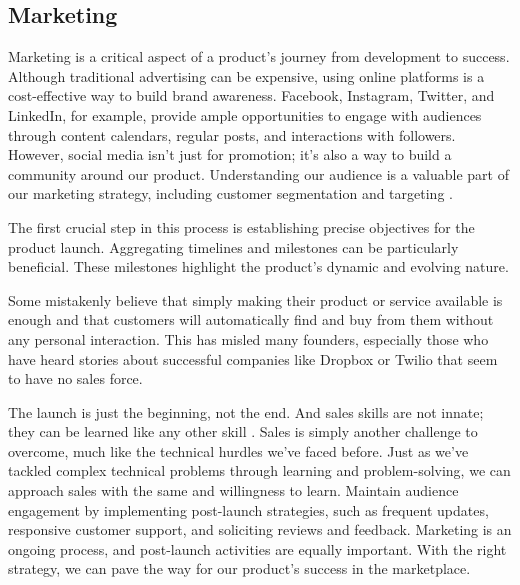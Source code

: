 
\subsection{Marketing}

Marketing is a critical aspect of a product's journey from development to success. Although traditional advertising can 
be expensive, using online platforms is a cost-effective way to build brand awareness. Facebook, Instagram, Twitter, and 
LinkedIn, for example, provide ample opportunities to engage with audiences through content calendars, regular posts, 
and interactions with followers. However, social media isn't just for promotion; it's also a way to build a community 
around our product. Understanding our audience is a valuable part of our marketing strategy, including customer 
segmentation and targeting \cite{Fras20}.

The first crucial step in this process is establishing precise objectives for the product launch. Aggregating timelines 
and milestones can be particularly beneficial. These milestones highlight the product's dynamic and evolving nature.

Some mistakenly believe that simply making their product or service available is enough and that customers will 
automatically find and buy from them without any personal interaction. This has misled many founders, especially those 
who have heard stories about successful companies like Dropbox or Twilio that seem to have no sales force. 

The launch is just the beginning, not the end. And sales skills are not innate; they can be learned like any other skill 
\cite{Dixo11}. Sales is simply another challenge to overcome, much like the technical hurdles we've faced before. Just 
as we've tackled complex technical problems through learning and problem-solving, we can approach sales with the same 
and willingness to learn. Maintain audience engagement by implementing post-launch strategies, such as frequent updates, 
responsive customer support, and soliciting reviews and feedback. Marketing is an ongoing process, and post-launch 
activities are equally important. With the right strategy, we can pave the way for our product's success in the 
marketplace.
